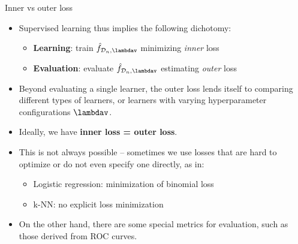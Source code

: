 \documentclass[11pt,compress,t,notes=noshow, xcolor=table]{beamer}
\begin{document}
\begin{vbframe}{Inner vs outer loss}

\begin{itemize}
  \item Supervised learning thus implies the following dichotomy:
  \begin{itemize}
    \item \textbf{Learning}: train $\fh_{\D_n, \lambdav}$ minimizing 
    \textit{inner} loss
    \item \textbf{Evaluation}: evaluate $\fh_{\D_n, \lambdav}$ estimating
    \textit{outer} loss
  \end{itemize}
  \item Beyond evaluating a single learner, the outer loss lends itself to
  comparing different types of learners, or learners with varying hyperparameter
  configurations $\lambdav$.
\end{itemize}

\lz

\begin{itemize}
  \item Ideally, we have \textbf{inner loss = outer loss}.
  \item This is not always possible -- sometimes we use losses that are 
  hard to optimize or do not even specify one directly, as in:
  \begin{itemize}
    \item Logistic regression: minimization of binomial loss
    \item k-NN: no explicit loss minimization
  \end{itemize}
  \item On the other hand, there are some special metrics for evaluation,
  such as those derived from ROC curves.
\end{itemize}

\end{vbframe}

\end{document}
